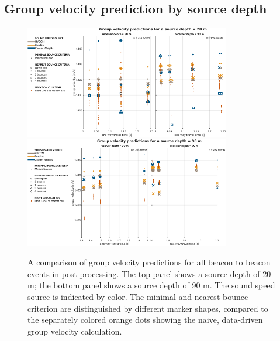 \subsection*{Group velocity prediction by source depth}
\begin{figure}[h!]
\includegraphics[width=0.8\textwidth]{figs/Fig10a.pdf} \\
\vspace{2em}
\includegraphics[width=0.8\textwidth]{figs/Fig10b.pdf}
\caption{A comparison of group velocity predictions for all beacon to beacon events in post-processing. The top panel shows a source depth of 20 m; the bottom panel shows a source depth of 90 m. The sound speed source is indicated by color. The minimal and nearest bounce criterion are distinguished by different marker shapes, compared to the separately colored orange dots showing the naive, data-driven group velocity calculation.}
\label{fig:gvelMore}
\end{figure}




